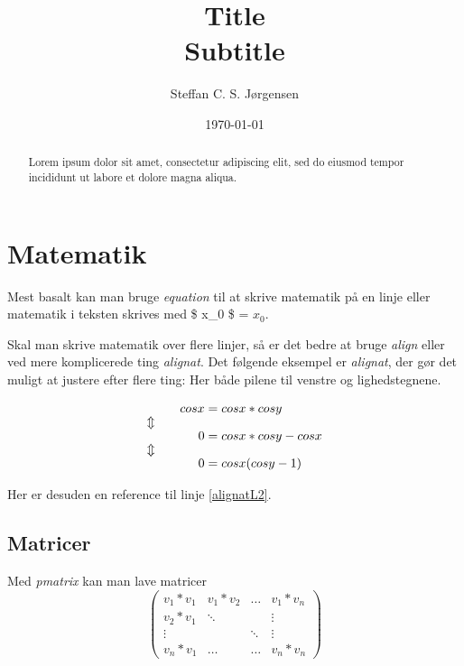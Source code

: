 \documentclass[a4, danish]{article}
\begin{document}
    \title{\huge Title \\ \large Subtitle}
    
    \author{Steffan C. S. Jørgensen}
    
    \date{\today}
    
    \chead{}

\maketitle

\begin{abstract}
\noindent Lorem ipsum dolor sit amet, consectetur adipiscing elit, sed do eiusmod tempor incididunt ut labore et dolore magna aliqua.
\end{abstract}

\tableofcontents

\newpage
\section{Matematik} \label{sec:math}
Mest basalt kan man bruge \emph{equation} til at skrive matematik på en linje eller matematik i teksten skrives med \$ x\_0 \$ = $x_0$.

Skal man skrive matematik over flere linjer, så er det bedre at bruge \emph{align} eller ved mere komplicerede ting \emph{alignat}. Det følgende eksempel er \emph{alignat}, der gør det muligt at justere efter flere ting: Her både pilene til venstre og lighedstegnene.

\begin{alignat}{2}
&& cos x &= cos x * cos y \label{alignatL1}
\\ \ArrowBetweenLines
&& 0 &= cos x * cos y - cos x \label{alignatL2}
\\ \ArrowBetweenLines
&& 0 &= cos x (cos y - 1) \label{alignatL3}
\end{alignat}

Her er desuden en reference til linje \ref{alignatL2}.

\subsection{Matricer}
Med \emph{pmatrix} kan man lave matricer
\begin{equation*}
	\begin{pmatrix}
		v_1 * v_1 & v_1 * v_2 & \dots & v_1 * v_n
\\		v_2 * v_1 & \ddots & & \vdots
\\		\vdots & & \ddots & \vdots
\\		v_n * v_1 & \dots & \dots & v_n * v_n
	\end{pmatrix}
\end{equation*}
\end{document}

